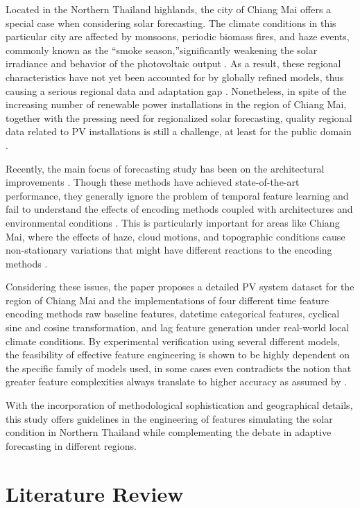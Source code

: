 \documentclass[conference]{IEEEtran}
\begin{document}
Located in the Northern Thailand highlands, the city of Chiang Mai offers a special case when considering solar forecasting. The climate conditions in this particular city are affected by monsoons, periodic biomass fires, and haze events, commonly known as the ``smoke season,''significantly weakening the solar irradiance and behavior of the photovoltaic output \cite{Amnuaylojaroen2020}. As a result, these regional characteristics have not yet been accounted for by globally refined models, thus causing a serious regional data and adaptation gap \cite{Seng2021}. Nonetheless, in spite of the increasing number of renewable power installations in the region of Chiang Mai, together with the pressing need for regionalized solar forecasting, quality regional data related to PV installations is still a challenge, at least for the public domain \cite{ASEAN2022}.

Recently, the main focus of forecasting study has been on the architectural improvements \cite{Wang2022}. Though these methods have achieved state-of-the-art performance, they generally ignore the problem of temporal feature learning and fail to understand the effects of encoding methods coupled with architectures and environmental conditions \cite{Cerqueira2020}. This is particularly important for areas like Chiang Mai, where the effects of haze, cloud motions, and topographic conditions cause non-stationary variations that might have different reactions to the encoding methods \cite{Prasertsan2021}.

Considering these issues, the paper proposes a detailed PV system dataset for the region of Chiang Mai and the implementations of four different time feature encoding methods raw baseline features, datetime categorical features, cyclical sine and cosine transformation, and lag feature generation under real-world local climate conditions. By experimental verification using several different models, the feasibility of effective feature engineering is shown to be highly dependent on the specific family of models used, in some cases even contradicts the notion that greater feature complexities always translate to higher accuracy as assumed by \cite{Bommes2021}.

With the incorporation of methodological sophistication and geographical details, this study offers guidelines in the engineering of features simulating the solar condition in Northern Thailand while complementing the debate in adaptive forecasting in different regions.

\section{Literature Review}
\end{document}
